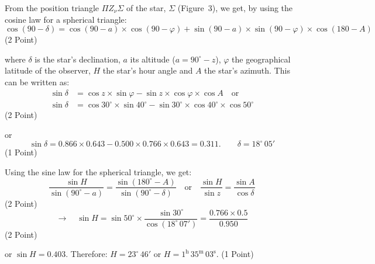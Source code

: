 From the position triangle $\Pi Z_\nu \Sigma$ of the star, $\Sigma$
(Figure~3), we get, by using the cosine law for a spherical triangle:
\[ \cos(90-\delta) = \cos(90-a)\times\cos(90-\varphi)
   + \sin(90-a)\times\sin(90-\varphi)\times\cos(180-A) \]
\hfill(2 Point)

where $\delta$ is the star's declination, $a$ its altitude
($a = 90^\circ - z$), $\varphi$ the geographical latitude of the observer,
$H$ the star's hour angle and $A$ the star's azimuth. This can be written as:
\begin{align*}
\sin\delta &= \cos z \times \sin\varphi - \sin z \times \cos\varphi \times \cos A
  \quad\text{or}\\
\sin\delta &= \cos 30^\circ \times \sin 40^\circ
  - \sin 30^\circ \times \cos 40^\circ \times \cos 50^\circ
\end{align*}
\hfill(2 Point)

or
\[ \sin\delta = 0.866\times 0.643 - 0.500\times 0.766\times 0.643 = 0.311.
   \qquad \delta = 18^\circ\,05' \]
\hfill(1 Point)

Using the sine law for the spherical triangle, we get:
\[ \frac{\sin H}{\sin(90^\circ - a)} = \frac{\sin(180^\circ - A)}{\sin(90^\circ - \delta)}
   \quad\text{or}\quad
   \frac{\sin H}{\sin z} = \frac{\sin A}{\cos\delta} \]
\hfill(2 Point)
\[ \rightarrow\quad
   \sin H = \sin 50^\circ \times \frac{\sin 30^\circ}{\cos(18^\circ\,07')}
   = \frac{0.766\times 0.5}{0.950} \]
\hfill(2 Point)

or $\sin H = 0.403$. Therefore: $H = 23^\circ\,46'$ or
$H = 1^{\mathrm{h}}\,35^{\mathrm{m}}\,03^{\mathrm{s}}$.
\hfill(1 Point)
